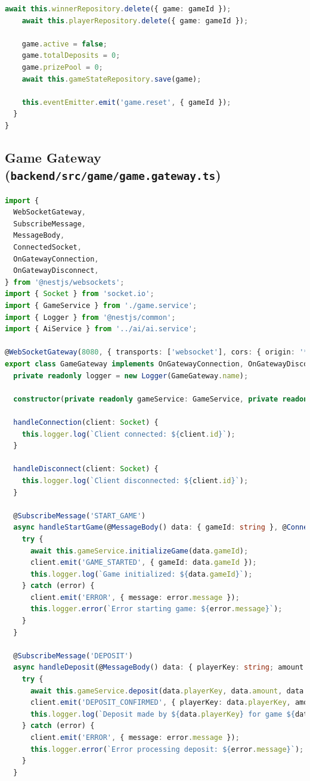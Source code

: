 \documentclass[11pt,a4paper]{article}
\begin{document}
\begin{lstlisting}[language=TypeScript, caption={Game Service}]
    await this.winnerRepository.delete({ game: gameId });
    await this.playerRepository.delete({ game: gameId });

    game.active = false;
    game.totalDeposits = 0;
    game.prizePool = 0;
    await this.gameStateRepository.save(game);

    this.eventEmitter.emit('game.reset', { gameId });
  }
}
\end{lstlisting}

\subsection{Game Gateway (\texttt{backend/src/game/game.gateway.ts})}

\begin{lstlisting}[language=TypeScript, caption={Game Gateway}]
import {
  WebSocketGateway,
  SubscribeMessage,
  MessageBody,
  ConnectedSocket,
  OnGatewayConnection,
  OnGatewayDisconnect,
} from '@nestjs/websockets';
import { Socket } from 'socket.io';
import { GameService } from './game.service';
import { Logger } from '@nestjs/common';
import { AiService } from '../ai/ai.service';

@WebSocketGateway(8080, { transports: ['websocket'], cors: { origin: '*' } })
export class GameGateway implements OnGatewayConnection, OnGatewayDisconnect {
  private readonly logger = new Logger(GameGateway.name);

  constructor(private readonly gameService: GameService, private readonly aiService: AiService) {}

  handleConnection(client: Socket) {
    this.logger.log(`Client connected: ${client.id}`);
  }

  handleDisconnect(client: Socket) {
    this.logger.log(`Client disconnected: ${client.id}`);
  }

  @SubscribeMessage('START_GAME')
  async handleStartGame(@MessageBody() data: { gameId: string }, @ConnectedSocket() client: Socket) {
    try {
      await this.gameService.initializeGame(data.gameId);
      client.emit('GAME_STARTED', { gameId: data.gameId });
      this.logger.log(`Game initialized: ${data.gameId}`);
    } catch (error) {
      client.emit('ERROR', { message: error.message });
      this.logger.error(`Error starting game: ${error.message}`);
    }
  }

  @SubscribeMessage('DEPOSIT')
  async handleDeposit(@MessageBody() data: { playerKey: string; amount: number; gameId: string }, @ConnectedSocket() client: Socket) {
    try {
      await this.gameService.deposit(data.playerKey, data.amount, data.gameId);
      client.emit('DEPOSIT_CONFIRMED', { playerKey: data.playerKey, amount: data.amount });
      this.logger.log(`Deposit made by ${data.playerKey} for game ${data.gameId}`);
    } catch (error) {
      client.emit('ERROR', { message: error.message });
      this.logger.error(`Error processing deposit: ${error.message}`);
    }
  }


\end{lstlisting}
\end{document}

